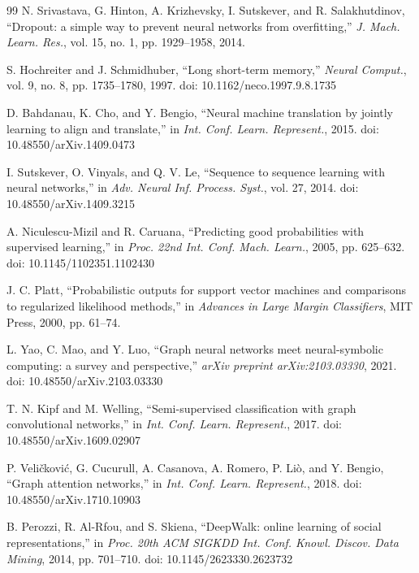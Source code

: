 \documentclass[preprint,12pt]{elsarticle}
\begin{document}
\begin{thebibliography}{99}
 N. Srivastava, G. Hinton, A. Krizhevsky, I. Sutskever, and R. Salakhutdinov, ``Dropout: a simple way to prevent neural networks from overfitting,'' \textit{J. Mach. Learn. Res.}, vol. 15, no. 1, pp. 1929--1958, 2014.

 S. Hochreiter and J. Schmidhuber, ``Long short-term memory,'' \textit{Neural Comput.}, vol. 9, no. 8, pp. 1735--1780, 1997. doi: 10.1162/neco.1997.9.8.1735

 D. Bahdanau, K. Cho, and Y. Bengio, ``Neural machine translation by jointly learning to align and translate,'' in \textit{Int. Conf. Learn. Represent.}, 2015. doi: 10.48550/arXiv.1409.0473

 I. Sutskever, O. Vinyals, and Q. V. Le, ``Sequence to sequence learning with neural networks,'' in \textit{Adv. Neural Inf. Process. Syst.}, vol. 27, 2014. doi: 10.48550/arXiv.1409.3215

 A. Niculescu-Mizil and R. Caruana, ``Predicting good probabilities with supervised learning,'' in \textit{Proc. 22nd Int. Conf. Mach. Learn.}, 2005, pp. 625--632. doi: 10.1145/1102351.1102430

 J. C. Platt, ``Probabilistic outputs for support vector machines and comparisons to regularized likelihood methods,'' in \textit{Advances in Large Margin Classifiers}, MIT Press, 2000, pp. 61--74.

 L. Yao, C. Mao, and Y. Luo, ``Graph neural networks meet neural-symbolic computing: a survey and perspective,'' \textit{arXiv preprint arXiv:2103.03330}, 2021. doi: 10.48550/arXiv.2103.03330

 T. N. Kipf and M. Welling, ``Semi-supervised classification with graph convolutional networks,'' in \textit{Int. Conf. Learn. Represent.}, 2017. doi: 10.48550/arXiv.1609.02907

 P. Veličković, G. Cucurull, A. Casanova, A. Romero, P. Liò, and Y. Bengio, ``Graph attention networks,'' in \textit{Int. Conf. Learn. Represent.}, 2018. doi: 10.48550/arXiv.1710.10903

 B. Perozzi, R. Al-Rfou, and S. Skiena, ``DeepWalk: online learning of social representations,'' in \textit{Proc. 20th ACM SIGKDD Int. Conf. Knowl. Discov. Data Mining}, 2014, pp. 701--710. doi: 10.1145/2623330.2623732


\end{thebibliography}
\end{document}
